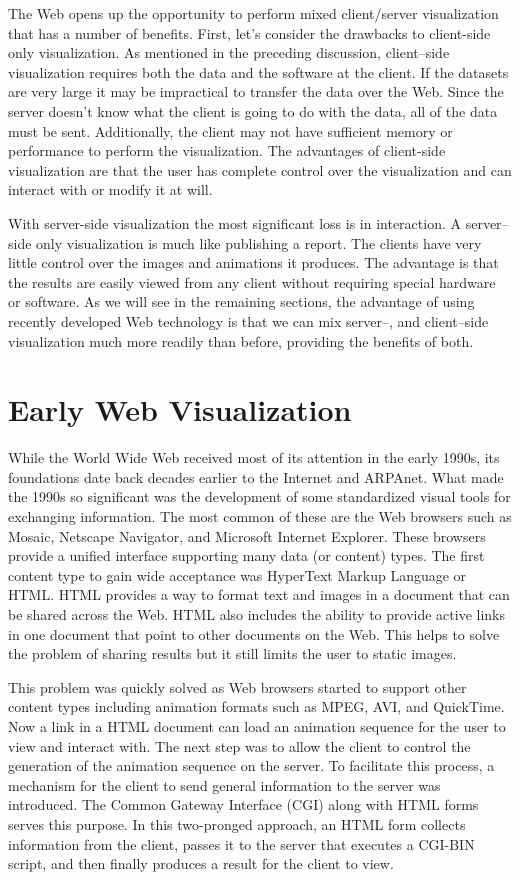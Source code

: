 The Web opens up the opportunity to perform mixed client/server visualization that has a number of benefits. First, let’s consider the drawbacks to client-side only visualization. As mentioned in the preceding discussion, client--side visualization requires both the data and the software at the client. If the datasets are very large it may be impractical to transfer the data over the Web. Since the server doesn’t know what the client is going to do with the data, all of the data must be sent. Additionally, the client may not have sufficient memory or performance to perform the visualization. The advantages of client-side visualization are that the user has complete control over the visualization and can interact with or modify it at will.

With server-side visualization the most significant loss is in interaction. A server--side only visualization is much like publishing a report. The clients have very little control over the images and animations it produces. The advantage is that the results are easily viewed from any client without requiring special hardware or software. As we will see in the remaining sections, the advantage of using recently developed Web technology is that we can mix server--, and client--side visualization much more readily than before, providing the benefits of both.

\section{Early Web Visualization}

While the World Wide Web received most of its attention in the early 1990s, its foundations date back decades earlier to the Internet and ARPAnet. What made the 1990s so significant was the development of some standardized visual tools for exchanging information. The most common of these are the Web browsers such as Mosaic, Netscape Navigator, and Microsoft Internet Explorer. These browsers provide a unified interface supporting many data (or content) types. The first content type to gain wide acceptance was HyperText Markup Language or HTML. HTML provides a way to format text and images in a document that can be shared across the Web. HTML also includes the ability to provide active links in one document that point to other documents on the Web. This helps to solve the problem of sharing results but it still limits the user to static images.

This problem was quickly solved as Web browsers started to support other content types including animation formats such as MPEG, AVI, and QuickTime. Now a link in a HTML document can load an animation sequence for the user to view and interact with. The next step was to allow the client to control the generation of the animation sequence on the server. To facilitate this process, a mechanism for the client to send general information to the server was introduced. The Common Gateway Interface (CGI) along with HTML forms serves this purpose. In this two-pronged approach, an HTML form collects information from the client, passes it to the server that executes a CGI-BIN script, and then finally produces a result for the client to view.

